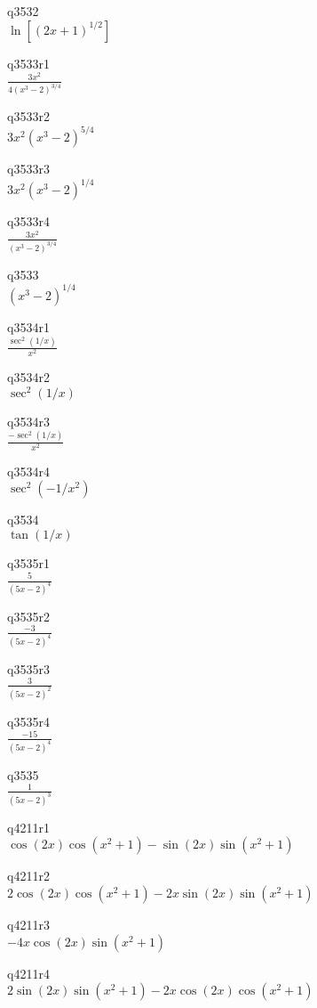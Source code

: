 q3532\\
\(\displaystyle \ln[(2x + 1)^{1/2}] \)

q3533r1\\
\(\displaystyle \frac{3x^2}{4(x^3 - 2)^{3/4}} \)

q3533r2\\
\(\displaystyle 3x^2(x^3 - 2)^{5/4} \)

q3533r3\\
\(\displaystyle 3x^2(x^3 - 2)^{1/4} \)

q3533r4\\
\(\displaystyle \frac{3x^2}{(x^3 - 2)^{3/4}} \)

q3533\\
\(\displaystyle (x^3 - 2)^{1/4} \)

q3534r1\\
\(\displaystyle \frac{\sec^2(1/x)}{x^2} \)

q3534r2\\
\(\displaystyle \sec^2(1/x) \)

q3534r3\\
\(\displaystyle \frac{-\sec^2(1/x)}{x^2} \)

q3534r4\\
\(\displaystyle \sec^2(-1/x^2) \)

q3534\\
\(\displaystyle \tan(1/x) \)

q3535r1\\
\(\displaystyle \frac{5}{(5x - 2)^4} \)

q3535r2\\
\(\displaystyle \frac{-3}{(5x - 2)^4} \)

q3535r3\\
\(\displaystyle \frac{3}{(5x - 2)^2} \)

q3535r4\\
\(\displaystyle \frac{-15}{(5x - 2)^4} \)

q3535\\
\(\displaystyle \frac{1}{(5x - 2)^3} \)

q4211r1\\
\(\displaystyle \cos(2x)\cos(x^2+1) - \sin(2x)\sin(x^2+1) \)

q4211r2\\
\(\displaystyle 2\cos(2x)\cos(x^2+1) - 2x\sin(2x)\sin(x^2+1) \)

q4211r3\\
\(\displaystyle -4x\cos(2x)\sin(x^2+1) \)

q4211r4\\
\(\displaystyle 2\sin(2x)\sin(x^2+1) - 2x\cos(2x)\cos(x^2+1) \)


